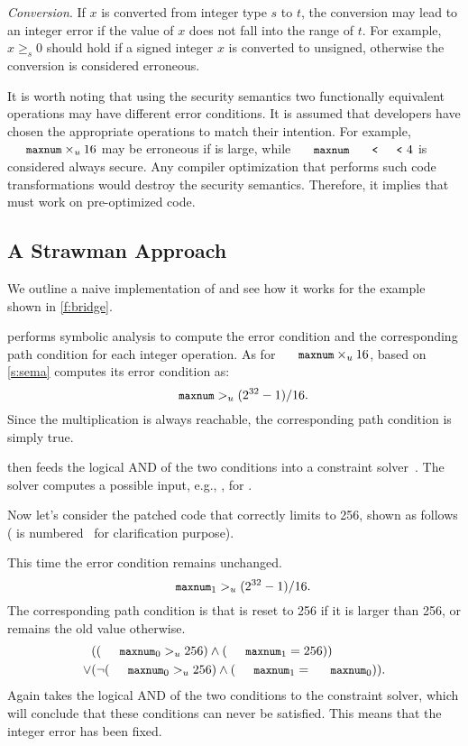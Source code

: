 \noindent
{\it Conversion}.
If $x$ is converted from integer type $s$ to $t$, the conversion
may lead to an integer error if the value of $x$ does not fall into
the range of $t$.  For example, $x \geq_s 0$ should hold if a signed
integer $x$ is converted to unsigned, otherwise the conversion is
considered erroneous.

It is worth noting that using the security semantics two functionally
equivalent operations may have different error conditions.  It is
assumed that developers have chosen the appropriate operations to
match their intention.  For example, $\cc{maxnum}\times_u 16$ may
be erroneous if  is large, while $\cc{maxnum} \shl 4$ is
considered always secure.  Any compiler optimization that performs
such code transformations would destroy the security semantics.
Therefore, it implies that \sys must work on pre-optimized code.

\subsection{A Strawman Approach}

We outline a naive implementation of \sys and see how it works
for the example shown in \autoref{f:bridge}.

\sys performs symbolic analysis to compute the error condition and
the corresponding path condition for each integer operation.  As
for $\cc{maxnum} \times_u 16$, based on \autoref{s:sema}
\sys computes its error condition as:
\begin{equation*}
\cc{maxnum} >_u (2^{32} - 1) / 16.
\end{equation*}
Since the multiplication is always reachable, the corresponding
path condition is simply true.

\sys then feeds the logical AND of the two conditions into a
constraint solver~\cite{boolector}.  The solver computes a possible
input, e.g., , for .

Now let's consider the patched code that correctly limits 
to 256, shown as follows ( is
numbered~\cite[\chapterautorefname~8.11]{whale} for clarification
purpose).

This time the error condition remains unchanged.
\begin{equation*}
\cc{maxnum}_1 >_u (2^{32} - 1) / 16.
\end{equation*}
The corresponding path condition is that  is reset to 256
if it is larger than 256, or remains the old value otherwise.
\begin{align*}
& ((\cc{maxnum}_0 >_u 256) \land (\cc{maxnum}_1 = 256)) \\
\lor
& (\neg (\cc{maxnum}_0 >_u 256) \land (\cc{maxnum}_1 = \cc{maxnum}_0)).
\end{align*}
Again \sys takes the logical AND of the two conditions to the
constraint solver, which will conclude that these conditions can
never be satisfied.  This means that the integer error has been
fixed.

